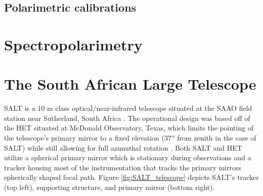 \subsection{Polarimetric calibrations}



\section{Spectropolarimetry} %



\section{The South African Large Telescope} %

\gls{SALT} is a 10 m class optical/near-infrared telescope situated at the \gls{SAAO} field station near Sutherland, South Africa \citep{SALT_optical_design}. The operational design was based off of the \gls{HET} situated at McDonald Observatory, Texas, which limits the pointing of the telescope's primary mirror to a fixed elevation (37$\degree$ from zenith in the case of SALT) while still allowing for full azimuthal rotation \citep{HET}. Both SALT and HET utilize a spherical primary mirror which is stationary during observations and a tracker housing most of the instrumentation that tracks the primary mirrors spherically shaped focal path. Figure \ref{fig:SALT_telescope} depicts \gls{SALT}'s tracker (top left), supporting structure, and primary mirror (bottom right).

